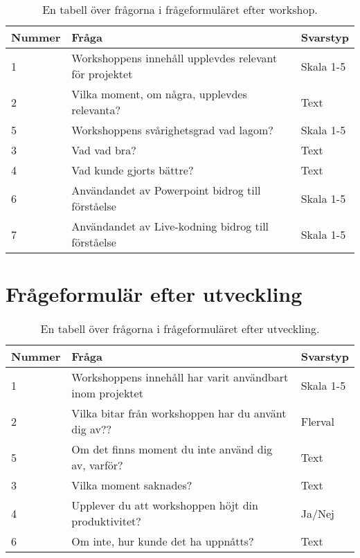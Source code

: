 \begin{table}[h!]
  \centering
  \caption{En tabell över frågorna i frågeformuläret efter workshop.}
  \def\arraystretch{1.5}
  \begin{adjustbox}{max width=\textwidth}
    \begin{tabularx}{\textwidth}{ | l | X | l |}
      \hline
      \textbf{Nummer} & \textbf{Fråga} & \textbf{Svarstyp} \\
      \hline
      1 & Workshoppens innehåll upplevdes relevant för projektet & Skala 1-5\\
      \hline
      2 & Vilka moment, om några, upplevdes relevanta? & Text \\
      \hline
      5 & Workshoppens svårighetsgrad vad lagom? & Skala 1-5 \\
      \hline
      3 & Vad vad bra? & Text \\
      \hline
      4 & Vad kunde gjorts bättre? & Text \\
      \hline
      6 & Användandet av Powerpoint bidrog till förståelse & Skala 1-5 \\
      \hline
      7 & Användandet av Live-kodning bidrog till förståelse & Skala 1-5 \\
      \hline
    \end{tabularx}
  \end{adjustbox}
  \label{tab:workshop_efter_formular}
\end{table}

\section{Frågeformulär efter utveckling}
\label{sec:workshop_formular_efter_utveckling}

\begin{table}[h!]
  \centering
  \caption{En tabell över frågorna i frågeformuläret efter utveckling.}
  \def\arraystretch{1.5}
  \begin{adjustbox}{max width=\textwidth}
    \begin{tabularx}{\textwidth}{ | l | X | l |}
      \hline
      \textbf{Nummer} & \textbf{Fråga} & \textbf{Svarstyp} \\
      \hline
      1 & Workshoppens innehåll har varit användbart inom projektet & Skala 1-5\\
      \hline
      2 & Vilka bitar från workshoppen har du använt dig av?? & Flerval \\
      \hline
      5 & Om det finns moment du inte använd dig av, varför? & Text \\
      \hline
      3 & Vilka moment saknades? & Text \\
      \hline
      4 & Upplever du att workshoppen höjt din produktivitet? & Ja/Nej \\
      \hline
      6 & Om inte, hur kunde det ha uppnåtts? & Text \\
      \hline
    \end{tabularx}
  \end{adjustbox}
  \label{tab:workshop_formular_efter_utveckling}
\end{table}

